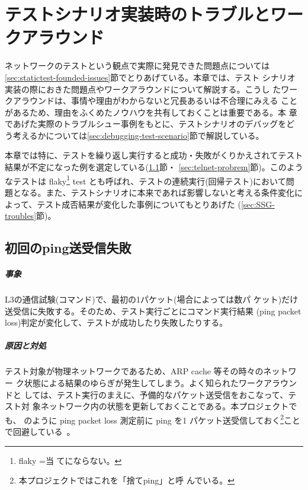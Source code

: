 
\chapter{テストシナリオ実装時のトラブルとワークアラウンド}
\label{cpt:troubles}

ネットワークのテストという観点で実際に発見できた問題点については
\ref{sec:statictest-founded-issues}節でとりあげている。本章では、テスト
シナリオ実装の際におきた問題点やワークアラウンドについて解説する。こうし
たワークアラウンドは、事情や理由がわからないと冗長あるいは不合理にみえる
ことがあるため、理由をふくめたノウハウを共有しておくことは重要である。本
章であげた実際のトラブルシュー事例をもとに、テストシナリオのデバッグをど
う考えるかについては\ref{sec:debugging-test-scenario}節で解説している。

本章では特に、テストを繰り返し実行すると成功・失敗がくりかえされてテスト
結果が不定になった例を選定している(\ref{sec:ping-probrem}節・
\ref{sec:telnet-probrem}節)。このようなテストは flaky\footnote{flaky =当
てにならない。} test とも呼ばれ、テストの連続実行(回帰テスト)において問
題となる。また、テストシナリオに本来であれば影響しないと考える条件変化に
よって、テスト成否結果が変化した事例についてもとりあげた
(\ref{sec:SSG-troubles}節)。

 \section{初回のping送受信失敗}
 \label{sec:ping-probrem}

    \paragraph{事象}
L3の通信試験(コマンド)で、最初の1パケット(場合によっては数パ
ケット)だけ送受信に失敗する。そのため、テスト実行ごとにコマンド実行結果
(ping packet loss)判定が変化して、テストが成功したり失敗したりする。

    \paragraph{原因と対処}
テスト対象が物理ネットワークであるため、ARP cache 等その時々のネットワー
ク状態による結果のゆらぎが発生してしまう。よく知られたワークアラウンドと
しては、テスト実行のまえに、予備的なパケット送受信をおこなって、テスト対
象ネットワーク内の状態を更新しておくことである。本プロジェクトでも、
のように ping packet loss 測定前に ping を1
パケット送受信しておく\footnote{本プロジェクトではこれを「捨てping」と呼
んでいる。}ことで回避している~\cite{examples-pr49}。

